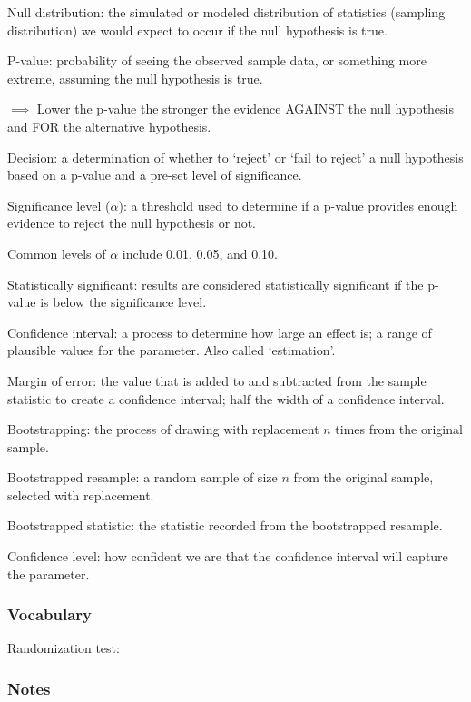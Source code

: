 \documentclass[
]{report}
\newcommand{\rgs}{\vspace{12pt}} %
\newcommand{\rgi}{\hspace{24pt}}  %
\begin{document}
Null distribution: the simulated or modeled distribution of statistics (sampling distribution) we would expect to occur if the null hypothesis is true.

P-value: probability of seeing the observed sample data, or something more extreme, assuming the null hypothesis is true.

\(\implies\) Lower the p-value the stronger the evidence AGAINST the null hypothesis and FOR the alternative hypothesis.

Decision: a determination of whether to `reject' or `fail to reject' a null hypothesis based on a p-value and a pre-set level of significance.

Significance level (\(\alpha\)): a threshold used to determine if a p-value provides enough evidence to reject the null hypothesis or not.

\rgi Common levels of \(\alpha\) include 0.01, 0.05, and 0.10.

Statistically significant: results are considered statistically significant if the p-value is below the significance level.

Confidence interval: a process to determine how large an effect is; a range of plausible values for the parameter. Also called `estimation'.

Margin of error: the value that is added to and subtracted from the sample statistic to create a confidence interval; half the width of a confidence interval.

Bootstrapping: the process of drawing with replacement \(n\) times from the original sample.

Bootstrapped resample: a random sample of size \(n\) from the original sample, selected with replacement.

Bootstrapped statistic: the statistic recorded from the bootstrapped resample.

Confidence level: how confident we are that the confidence interval will capture the parameter.

\hypertarget{vocabulary-15}{%
\subsubsection*{Vocabulary}\label{vocabulary-15}}

Randomization test:
\rgs

\hypertarget{notes-19}{%
\subsubsection*{Notes}\label{notes-19}}
\end{document}

